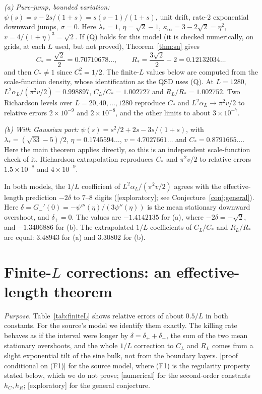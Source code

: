 \documentclass[11pt,a4paper]{article}
\theoremstyle{definition}
\theoremstyle{remark}
\newcommand{\1}{\mathbf 1}
\newcommand{\status}[1]{\textsf{[#1]}}
\begin{document}
\emph{(a) Pure-jump, bounded variation:} $\psi(s)=s-2s/(1+s)=s(s-1)/(1+s)$, unit drift, rate-$2$ exponential downward jumps, $\sigma=0$. Here $\lambda_*=1$, $\eta=\sqrt2-1$, $\kappa_\infty=3-2\sqrt2=\eta^2$, $v=4/(1+\eta)^3=\sqrt2$. If (Q) holds for this model (it is checked numerically, on grids, at each $L$ used, but not proved), Theorem~\ref{thm:sn} gives
\[
 C_*=\frac{\sqrt2}{2}=0.70710678\ldots,\qquad R_*=\frac{3\sqrt2}2-2=0.12132034\ldots
\]
and then $C_*\neq1$ since $C_*^2=1/2$. The finite-$L$ values below are computed from the scale-function density, whose identification as the QSD uses (Q). At $L=1280$, $L^2\alpha_L/(\pi^2v/2)=0.998897$, $C_L/C_*=1.002727$ and $R_L/R_*=1.002752$. Two Richardson levels over $L=20,40,\dots,1280$ reproduce $C_*$ and $L^2\alpha_L\to\pi^2v/2$ to relative errors $2\times10^{-9}$ and $2\times10^{-8}$, and the other limits to about $3\times10^{-7}$.

\emph{(b) With Gaussian part:} $\psi(s)=s^2/2+2s-3s/(1+s)$, with $\lambda_*=(\sqrt{33}-5)/2$, $\eta=0.1745594\ldots$, $v=4.7027661\ldots$ and $C_*=0.8791665\ldots$. Here the main theorem applies directly, so this is an independent scale-function check of it. Richardson extrapolation reproduces $C_*$ and $\pi^2v/2$ to relative errors $1.5\times10^{-8}$ and $4\times10^{-9}$.

In both models, the $1/L$ coefficient of $L^2\alpha_L/(\pi^2v/2)$ agrees with the effective-length prediction $-2\delta$ to 7--8 digits (\status{exploratory}; see Conjecture~\ref{conj:general}). Here $\delta=G_-'(0)=-\psi'''(\eta)/(3\psi''(\eta))$ is the mean stationary downward overshoot, and $\delta_+=0$. The values are $-1.4142135$ for (a), where $-2\delta=-\sqrt2$, and $-1.3406886$ for (b). The extrapolated $1/L$ coefficients of $C_L/C_*$ and $R_L/R_*$ are equal: $3.48943$ for (a) and $3.30802$ for (b).
\section{Finite-$L$ corrections: an effective-length theorem}\label{sec:finiteL}
\emph{Purpose.} Table~\ref{tab:finiteL} shows relative errors of about $0.5/L$ in both constants. For the source's model we identify them exactly. The killing rate behaves as if the interval were longer by $\delta=\delta_++\delta_-$, the sum of the two mean stationary overshoots, and the whole $1/L$ correction to $C_L$ and $R_L$ comes from a slight exponential tilt of the sine bulk, not from the boundary layers. \status{proof conditional on (F1)} for the source model, where (F1) is the regularity property stated below, which we do not prove; \status{numerical} for the second-order constants $h_C,h_R$; \status{exploratory} for the general conjecture.
\end{document}
